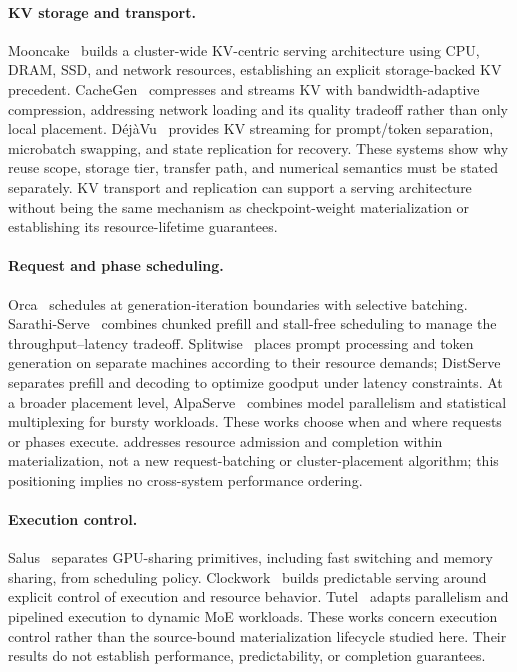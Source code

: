 \paragraph{KV storage and transport.}
Mooncake~\cite{qin2025mooncake} builds a cluster-wide KV-centric serving
architecture using CPU, DRAM, SSD, and network resources, establishing an
explicit storage-backed KV precedent. CacheGen~\cite{liu2024cachegen}
compresses and streams KV with bandwidth-adaptive compression, addressing
network loading and its quality tradeoff rather than only local placement.
D{\'e}j{\`a}Vu~\cite{strati2024dejavu} provides KV streaming for prompt/token
separation, microbatch swapping, and state replication for recovery.
These systems show why reuse scope, storage tier, transfer path, and numerical
semantics must be stated separately. KV transport and replication can support
a serving architecture without being the same mechanism as checkpoint-weight
materialization or establishing its resource-lifetime guarantees.

\paragraph{Request and phase scheduling.}
Orca~\cite{yu2022orca} schedules at generation-iteration boundaries with
selective batching. Sarathi-Serve~\cite{agrawal2024sarathiserve} combines
chunked prefill and stall-free scheduling to manage the throughput--latency
tradeoff. Splitwise~\cite{patel2024splitwise} places prompt processing and
token generation on separate machines according to their resource demands;
DistServe~\cite{zhong2024distserve} separates prefill and decoding to optimize
goodput under latency constraints. At a broader placement level,
AlpaServe~\cite{li2023alpaserve} combines model parallelism and statistical
multiplexing for bursty workloads. These works choose when and where requests
or phases execute. \system{} addresses resource admission and completion
within materialization, not a new request-batching or cluster-placement
algorithm; this positioning implies no cross-system performance ordering.

\paragraph{Execution control.}
Salus~\cite{yu2020salus} separates GPU-sharing primitives, including fast
switching and memory sharing, from scheduling policy.
Clockwork~\cite{gujarati2020clockwork} builds predictable serving around
explicit control of execution and resource behavior.
Tutel~\cite{hwang2023tutel} adapts parallelism and pipelined execution to
dynamic MoE workloads. These works concern execution control rather than the
source-bound materialization lifecycle studied here. Their results do not
establish \system{} performance, predictability, or completion guarantees.

